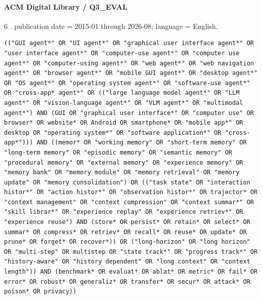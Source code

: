 \noindent\begin{minipage}{\linewidth}
\paragraph{ACM Digital Library / Q3\_EVAL}
6 .
publication date = 2015-01 through 2026-08; language = English.
\begin{lstlisting}
(("GUI agent*" OR "UI agent*" OR "graphical user interface agent*" OR "user interface agent*" OR "computer-use agent*" OR "computer use agent*" OR "computer-using agent*" OR "web agent*" OR "web navigation agent*" OR "browser agent*" OR "mobile GUI agent*" OR "desktop agent*" OR "OS agent*" OR "operating system agent*" OR "software-use agent*" OR "cross-app* agent*" OR (("large language model agent*" OR "LLM agent*" OR "vision-language agent*" OR "VLM agent*" OR "multimodal agent*") AND (GUI OR "graphical user interface*" OR "computer use" OR browser* OR website* OR Android OR smartphone* OR "mobile app*" OR desktop OR "operating system*" OR "software application*" OR "cross-app*"))) AND ((memor* OR "working memory" OR "short-term memory" OR "long-term memory" OR "episodic memory" OR "semantic memory" OR "procedural memory" OR "external memory" OR "experience memory" OR "memory bank" OR "memory module" OR "memory retrieval" OR "memory update" OR "memory consolidation") OR (("task state" OR "interaction histor*" OR "action histor*" OR "observation histor*" OR trajector* OR "context management" OR "context compression" OR "context summar*" OR "skill librar*" OR "experience replay" OR "experience retriev*" OR "experience reuse") AND (store* OR persist* OR retain* OR select* OR summar* OR compress* OR retriev* OR recall* OR reuse* OR update* OR prune* OR forget* OR recover*)) OR ("long-horizon" OR "long horizon" OR "multi-step" OR multistep OR "state track*" OR "progress track*" OR "history-aware" OR "history dependent" OR "long context" OR "context length")) AND (benchmark* OR evaluat* OR ablat* OR metric* OR fail* OR error* OR robust* OR generaliz* OR transfer* OR secur* OR attack* OR poison* OR privacy))
\end{lstlisting}
\end{minipage}\par\medskip

